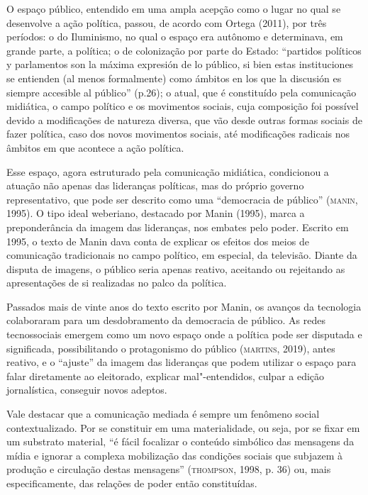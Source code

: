O espaço público, entendido em uma ampla acepção como o lugar no qual se
desenvolve a ação política, passou, de acordo com Ortega (2011), por
três períodos: o do Iluminismo, no qual o espaço era autônomo e
determinava, em grande parte, a política; o de colonização por parte do
Estado: ``partidos políticos y parlamentos son la máxima expresión de lo
público, si bien estas instituciones se entienden (al menos formalmente)
como ámbitos en los que la discusión es siempre accesible al público''
(p.26); o atual, que é constituído pela comunicação midiática, o campo
político e os movimentos sociais, cuja composição foi possível devido a
modificações de natureza diversa, que vão desde outras formas sociais de
fazer política, caso dos novos movimentos sociais, até modificações
radicais nos âmbitos em que acontece a ação política.

Esse espaço, agora estruturado pela comunicação midiática, condicionou a
atuação não apenas das lideranças políticas, mas do próprio governo
representativo, que pode ser descrito como uma ``democracia de público''
(\textsc{manin}, 1995). O tipo ideal weberiano, destacado por Manin (1995), marca
a preponderância da imagem das lideranças, nos embates pelo poder.
Escrito em 1995, o texto de Manin dava conta de explicar os efeitos dos
meios de comunicação tradicionais no campo político, em especial, da
televisão. Diante da disputa de imagens, o público seria apenas reativo,
aceitando ou rejeitando as apresentações de si realizadas no palco da
política.

Passados mais de vinte anos do texto escrito por Manin, os avanços da
tecnologia colaboraram para um desdobramento da democracia de público.
As redes tecnossociais emergem como um novo espaço onde a política pode
ser disputada e significada, possibilitando o protagonismo do público
(\textsc{martins}, 2019), antes reativo, e o ``ajuste'' da imagem das lideranças
que podem utilizar o espaço para falar diretamente ao eleitorado,
explicar mal"-entendidos, culpar a edição jornalística, conseguir novos
adeptos.

Vale destacar que a comunicação mediada é sempre um fenômeno social
contextualizado. Por se constituir em uma materialidade, ou seja, por se
fixar em um substrato material, ``é fácil focalizar o conteúdo simbólico
das mensagens da mídia e ignorar a complexa mobilização das condições
sociais que subjazem à produção e circulação destas mensagens''
(\textsc{thompson}, 1998, p. 36) ou, mais especificamente, das relações de poder
então constituídas.

